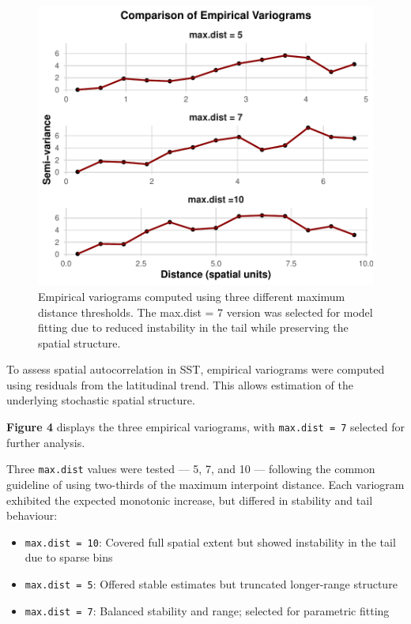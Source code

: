 \documentclass[
  11pt,
]{article}
\begin{document}
\begin{figure}[H]

{\centering \includegraphics{project_files/figure-pdf/fig-variogcompare-1.pdf}

}

\caption{Empirical variograms computed using three different maximum
distance thresholds. The max.dist = 7 version was selected for model
fitting due to reduced instability in the tail while preserving the
spatial structure.}

\end{figure}%

To assess spatial autocorrelation in SST, empirical variograms were
computed using residuals from the latitudinal trend. This allows
estimation of the underlying stochastic spatial structure.

\textbf{Figure 4} displays the three empirical variograms, with
\texttt{max.dist\ =\ 7} selected for further analysis.

Three \texttt{max.dist} values were tested --- 5, 7, and 10 ---
following the common guideline of using two-thirds of the maximum
interpoint distance. Each variogram exhibited the expected monotonic
increase, but differed in stability and tail behaviour:

\begin{itemize}
\item
  \texttt{max.dist\ =\ 10}: Covered full spatial extent but showed
  instability in the tail due to sparse bins
\item
  \texttt{max.dist\ =\ 5}: Offered stable estimates but truncated
  longer-range structure
\item
  \texttt{max.dist\ =\ 7}: Balanced stability and range; selected for
  parametric fitting
\end{itemize}
\end{document}
